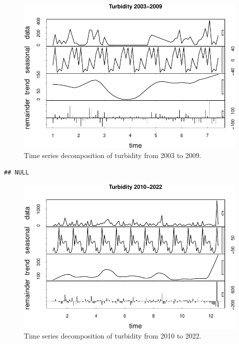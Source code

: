 \documentclass[
  12pt,
]{article}
\begin{document}
\begin{figure}

{\centering \includegraphics{Project_Template_files/figure-latex/Plot of Early Turbidity Time Series Decomposition-1} 

}

\caption{Time series decomposition of turbidity from 2003 to 2009.}\label{fig:Plot of Early Turbidity Time Series Decomposition}
\end{figure}

\begin{verbatim}
## NULL
\end{verbatim}

\begin{figure}

{\centering \includegraphics{Project_Template_files/figure-latex/Plot of Late Turbidity Time Series Decomposition-1} 

}

\caption{Time series decomposition of turbidity from 2010 to 2022.}\label{fig:Plot of Late Turbidity Time Series Decomposition}
\end{figure}
\end{document}
